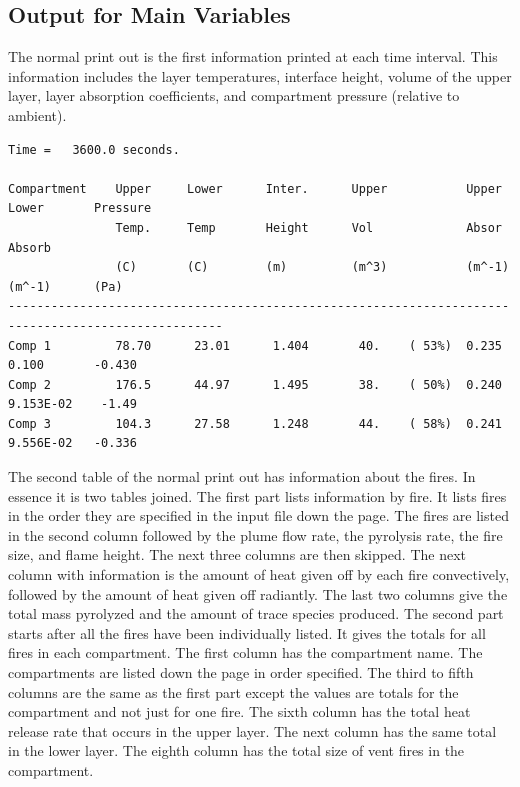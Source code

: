 \subsection{Output for Main Variables}

The normal print out is the first information printed at each time interval.  This information includes the layer temperatures, interface height, volume of the upper layer, layer absorption coefficients, and compartment pressure (relative to ambient).

\begin{lstlisting}[basicstyle=\tiny]
Time =   3600.0 seconds.

Compartment    Upper     Lower      Inter.      Upper           Upper      Lower       Pressure
               Temp.     Temp       Height      Vol             Absor      Absorb
               (C)       (C)        (m)         (m^3)           (m^-1)     (m^-1)      (Pa)
----------------------------------------------------------------------------------------------------
Comp 1         78.70      23.01      1.404       40.    ( 53%)  0.235      0.100       -0.430
Comp 2         176.5      44.97      1.495       38.    ( 50%)  0.240      9.153E-02    -1.49
Comp 3         104.3      27.58      1.248       44.    ( 58%)  0.241      9.556E-02   -0.336
\end{lstlisting}
The second table of the normal print out has information about the fires.  In essence it is two tables joined.  The first part lists information by fire. It lists fires in the order they are specified in the input file down the page.  The fires are listed in the second column followed by the plume flow rate, the pyrolysis rate, the fire size, and flame height.  The next three columns are then skipped.  The next column with information is the amount of heat given off by each fire convectively, followed by the amount of heat given off radiantly. The last two columns give the total mass pyrolyzed and the amount of trace species produced.  The second part starts after all the fires have been individually listed.  It gives the totals for all fires in each compartment.  The first column has the compartment name.  The compartments are listed down the page in order specified.  The third to fifth columns are the same as the first part except the values are totals for the compartment and not just for one fire.  The sixth column has the total heat release rate that occurs in the upper layer.  The next column has the same total in the lower layer.  The eighth column has the total size of vent fires in the compartment.


